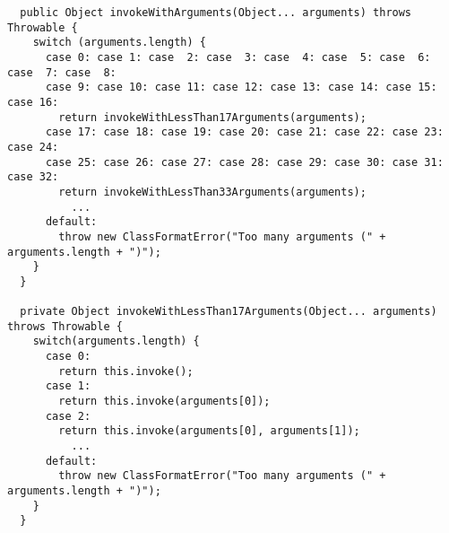 {\tiny \begin{verbatim}
  public Object invokeWithArguments(Object... arguments) throws Throwable {
    switch (arguments.length) {
      case 0: case 1: case  2: case  3: case  4: case  5: case  6: case  7: case  8:
      case 9: case 10: case 11: case 12: case 13: case 14: case 15: case 16:
        return invokeWithLessThan17Arguments(arguments);
      case 17: case 18: case 19: case 20: case 21: case 22: case 23: case 24:
      case 25: case 26: case 27: case 28: case 29: case 30: case 31: case 32:
        return invokeWithLessThan33Arguments(arguments);
          ...
      default:
        throw new ClassFormatError("Too many arguments (" + arguments.length + ")");
    }
  }

  private Object invokeWithLessThan17Arguments(Object... arguments) throws Throwable {
    switch(arguments.length) {
      case 0:
        return this.invoke();
      case 1:
        return this.invoke(arguments[0]);
      case 2:
        return this.invoke(arguments[0], arguments[1]);
          ...
      default:
        throw new ClassFormatError("Too many arguments (" + arguments.length + ")");
    }
  }
\end{verbatim} }
